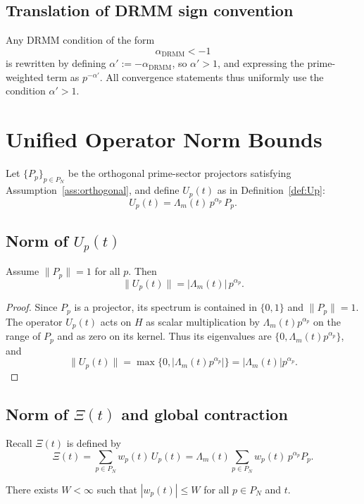 \documentclass[11pt]{article}
\begin{document}
\subsection{Translation of DRMM sign convention}

Any DRMM condition of the form
\[
\alpha_{\text{DRMM}} < -1
\]
is rewritten by defining $\alpha' := -\alpha_{\text{DRMM}}$, so
$\alpha' > 1$, and expressing the prime-weighted term as $p^{-\alpha'}$.
All convergence statements thus uniformly use the condition $\alpha' > 1$.

\section{Unified Operator Norm Bounds}

Let $\{P_p\}_{p\in P_N}$ be the orthogonal prime-sector projectors satisfying
Assumption~\ref{ass:orthogonal}, and define $U_p(t)$ as in
Definition~\ref{def:Up}:
\[
U_p(t) = \Lambda_m(t)\, p^{\alpha_p}\, P_p.
\]

\subsection{Norm of $U_p(t)$}

\begin{lemma}
Assume $\|P_p\| = 1$ for all $p$. Then
\[
\|U_p(t)\| = |\Lambda_m(t)|\, p^{\alpha_p}.
\]
\end{lemma}

\begin{proof}
Since $P_p$ is a projector, its spectrum is contained in $\{0,1\}$ and
$\|P_p\| = 1$. The operator $U_p(t)$ acts on $H$ as scalar multiplication
by $\Lambda_m(t) p^{\alpha_p}$ on the range of $P_p$ and as zero on its
kernel. Thus its eigenvalues are $\{0, \Lambda_m(t) p^{\alpha_p}\}$, and
\[
\|U_p(t)\| = \max\{0,|\Lambda_m(t)p^{\alpha_p}|\}
= |\Lambda_m(t)| p^{\alpha_p}.
\]
\end{proof}

\subsection{Norm of $\Xi(t)$ and global contraction}

Recall $\Xi(t)$ is defined by
\[
\Xi(t) = \sum_{p\in P_N} w_p(t)\, U_p(t)
= \Lambda_m(t)\sum_{p\in P_N} w_p(t)\, p^{\alpha_p} P_p.
\]

\begin{assumption}
There exists $W < \infty$ such that $|w_p(t)| \le W$ for all $p\in P_N$ and $t$.
\end{assumption}
\end{document}
